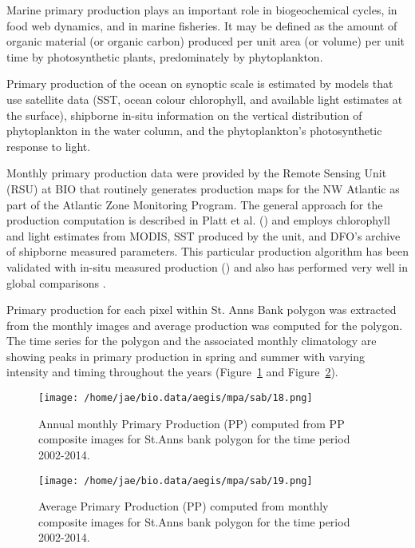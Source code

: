 \documentclass[letterpaper,portrait,11pt]{scrartcl}
\numberwithin{equation}{section}    %
\numberwithin{figure}{section}    %
\numberwithin{table}{section}       %
\begin{document}
Marine primary production plays an important role in biogeochemical cycles, in food web dynamics, and in marine fisheries. It may be defined as the amount of organic material (or organic carbon) produced per unit area (or volume) per unit time by photosynthetic plants, predominately by phytoplankton.

Primary production of the ocean on synoptic scale is estimated by models that use satellite data (SST, ocean colour chlorophyll, and available light estimates at the surface), shipborne in-situ information on the vertical distribution of phytoplankton in the water column, and the phytoplankton\textquoteright s photosynthetic response to light.

Monthly primary production data were provided by the Remote Sensing Unit (RSU) at BIO that routinely generates production maps for the NW Atlantic as part of the Atlantic Zone Monitoring Program. The general approach for the production computation is described in Platt et al. (\cite{platt2008}) and employs chlorophyll and light estimates from MODIS, SST produced by the unit, and DFO's archive of shipborne measured parameters. This particular production algorithm has been validated with in-situ measured production (\cite{platt1988}) and also has performed very well in global comparisons \parencite{carr2006comparison}.

Primary production for each pixel within St. Anns Bank polygon was extracted from the monthly images and average production was computed for the polygon. The time series for the polygon and the associated monthly climatology are showing peaks in primary production in spring and summer with varying intensity and timing throughout the years (Figure~\ref{fig:ppTSmonthly} and Figure~\ref{fig:ppTSannual}). 


\begin{figure}[h]
  \centering
  \texttt{[image: /home/jae/bio.data/aegis/mpa/sab/18.png]}
  \caption{Annual monthly Primary Production (PP) computed from PP composite images for St.Anns bank polygon for the time period 2002-2014.}
  \label{fig:ppTSmonthly}
\end{figure}


\begin{figure}[h]
  \centering
  \texttt{[image: /home/jae/bio.data/aegis/mpa/sab/19.png]}
  \caption{Average Primary Production (PP) computed from monthly composite images for St.Anns bank polygon for the time period 2002-2014.}
  \label{fig:ppTSannual}
\end{figure}
\end{document}
